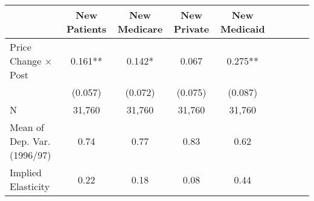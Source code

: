  \begin{tabular}{l*{4}{cc}}
\midrule
                    &\multicolumn{1}{c}{New Patients}&\multicolumn{1}{c}{New Medicare}&\multicolumn{1}{c}{New Private}&\multicolumn{1}{c}{New Medicaid}\\
\midrule
Price Change $\times$ Post&       0.161**&       0.142* &       0.067  &       0.275**\\
                    &     (0.057)  &     (0.072)  &     (0.075)  &     (0.087)  \\
\addlinespace
\midrule
N                   &      31,760  &      31,760  &      31,760  &      31,760  \\
Mean of Dep. Var. (1996/97)&        0.74  &        0.77  &        0.83  &        0.62  \\
Implied Elasticity  &        0.22  &        0.18  &        0.08  &        0.44  \\
\midrule
\end{tabular}
